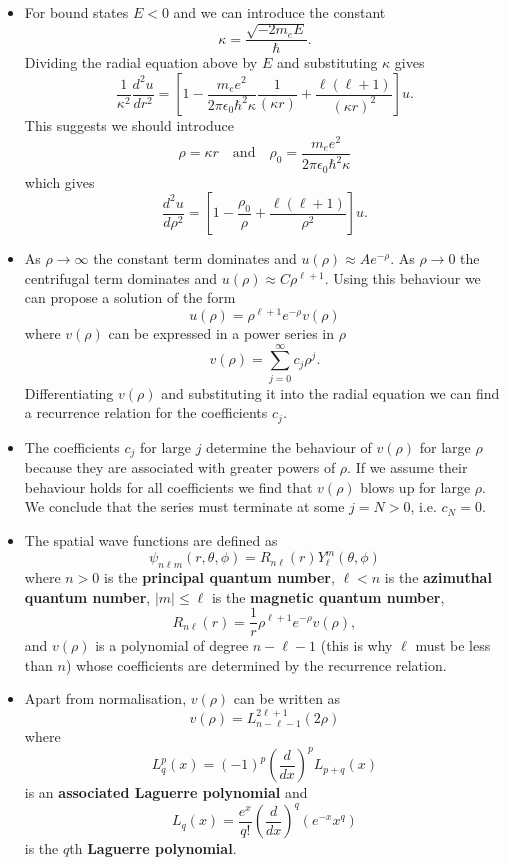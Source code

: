\documentclass{article}
\begin{document}
\begin{itemize}
  \item For bound states $E < 0$ and we can introduce the constant \[\kappa = \frac{\sqrt{-2 m_e E}}{\hbar}.\] Dividing the radial equation above by $E$ and substituting $\kappa$ gives \[\frac{1}{\kappa^2} \frac{d^2 u}{d r^2} = \left[ 1 - \frac{m_e e^2}{2 \pi \epsilon_0 \hbar^2 \kappa} \frac{1}{(\kappa r)} + \frac{\ell (\ell + 1)}{(\kappa r)^2} \right] u.\] This suggests we should introduce \[\rho = \kappa r \quad \text{and} \quad \rho_0 = \frac{m_e e^2}{2 \pi \epsilon_0 \hbar^2 \kappa}\] which gives \[\frac{d^2 u}{d \rho^2} = \left[ 1 - \frac{\rho_0}{\rho} + \frac{\ell (\ell + 1)}{\rho^2} \right] u.\]

  \item As $\rho \rightarrow \infty$ the constant term dominates and $u(\rho) \approx A e^{-\rho}$. As $\rho \rightarrow 0$ the centrifugal term dominates and $u(\rho) \approx C \rho^{\ell + 1}$. Using this behaviour we can propose a solution of the form \[u(\rho) = \rho^{\ell + 1} e^{-\rho} v(\rho)\] where $v(\rho)$ can be expressed in a power series in $\rho$ \[v(\rho) = \sum_{j = 0}^\infty c_j \rho^j.\] Differentiating $v(\rho)$ and substituting it into the radial equation we can find a recurrence relation for the coefficients $c_j$.

  \item The coefficients $c_j$ for large $j$ determine the behaviour of $v(\rho)$ for large $\rho$ because they are associated with greater powers of $\rho$. If we assume their behaviour holds for all coefficients we find that $v(\rho)$ blows up for large $\rho$. We conclude that the series must terminate at some $j = N > 0$, i.e. $c_N = 0$.
  
  \item The spatial wave functions are defined as \[\psi_{n \ell m}(r, \theta, \phi) = R_{n \ell}(r) Y_\ell^m(\theta, \phi)\] where $n > 0$ is the \textbf{principal quantum number}, $\ell < n$ is the \textbf{azimuthal quantum number}, $|m| \le \ell$ is the \textbf{magnetic quantum number}, \[R_{n \ell}(r) = \frac{1}{r} \rho^{\ell + 1} e^{-\rho} v(\rho),\] and $v(\rho)$ is a polynomial of degree $n - \ell - 1$ (this is why $\ell$ must be less than $n$) whose coefficients are determined by the recurrence relation.
  
  \item Apart from normalisation, $v(\rho)$ can be written as \[v(\rho) = L_{n - \ell - 1}^{2 \ell + 1}(2 \rho)\] where \[L_q^p(x) = (-1)^p \left( \frac{d}{d x} \right)^p L_{p + q}(x)\] is an \textbf{associated Laguerre polynomial} and \[L_q(x) = \frac{e^x}{q!} \left( \frac{d}{d x} \right)^q (e^{-x} x^q)\] is the $q$th \textbf{Laguerre polynomial}.
  

\end{itemize}
\end{document}
